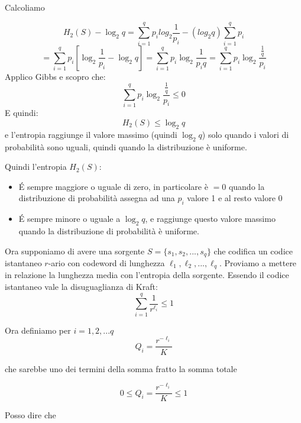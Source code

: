 Calcoliamo

\begin{equation*}
H_2(S)-\log_2q = \sum_{i=1}^qp_ilog_2\frac{1}{p_i} - (log_2q)\sum_{i=1}^qp_i
\end{equation*}
\begin{equation*}
= \sum_{i=1}^qp_i[\log_2\frac{1}{p_i} - \log_2q] = \sum_{i=1}^qp_i\log_2\frac{1}{p_iq} = \sum_{i=1}^qp_i\log_2\frac{\frac{1}{q}}{p_i}
\end{equation*}
Applico Gibbs e scopro che:
\begin{equation*}
 \sum_{i=1}^qp_i\log_2\frac{\frac{1}{q}}{p_i} \leq 0
\end{equation*}
E quindi:
\begin{equation*}
H_2(S) \leq \log_2q
\end{equation*}
e l'entropia raggiunge il valore massimo (quindi $\log_2q$) solo quando i valori di probabilità sono uguali, quindi quando la distribuzione è uniforme.

Quindi l'entropia $H_2(S)$:
\begin{itemize}
	\item \'E sempre maggiore o uguale di zero, in particolare è $=0$ quando la distribuzione di probabilità assegna ad una $p_i$ valore 1 e al resto valore 0
	\item \' E sempre minore o uguale a $\log_2q$, e raggiunge questo valore massimo quando la distribuzione di probabilità è uniforme.
\end{itemize}

Ora supponiamo di avere una sorgente $S=\{s_1, s_2, ..., s_q\}$ che codifica un codice istantaneo $r$-ario con codeword di lunghezza $\ell_1, \ell_2, ..., \ell_q$.
Proviamo a mettere in relazione la lunghezza media con l'entropia della sorgente.
Essendo il codice istantaneo vale la disuguaglianza di Kraft:
\begin{equation*}
\sum_{i=1}^q\frac{1}{r^{\ell_i}} \leq 1
\end{equation*}

Ora definiamo per $i=1,2,...q$ 
\begin{equation*}
Q_i = \frac{r^{-\ell_i}}{K}
\end{equation*}

che sarebbe uno dei termini della somma fratto la somma totale

\begin{equation*}
0 \leq Q_i = \frac{r^{-\ell_i}}{K} \leq 1
\end{equation*}

Posso dire che

